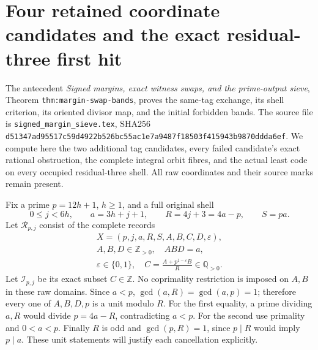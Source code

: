 \section{Four retained coordinate candidates and the exact residual-three first hit}
\label{sec:boundary-four-candidates}

The antecedent \emph{Signed margins, exact witness swaps, and the
prime-output sieve}, Theorem \texttt{thm:margin-swap-bands}, proves
the same-tag exchange, its shell criterion, its oriented divisor map,
and the initial forbidden bands. The source file is
\texttt{signed\_margin\_sieve.tex}, SHA256
\texttt{d51347ad95517c59d4922b526bc55ac1e7a9487f18503f415943b9870ddda6ef}.
We compute here the two additional tag candidates, every failed
candidate's exact rational obstruction, the complete integral orbit
fibres, and the actual least code on every occupied residual-three
shell. All raw coordinates and their source marks remain present.

Fix a prime \(p=12h+1\), \(h\ge1\), and a full original shell
\[
 0\le j<6h,\qquad a=3h+j+1,\qquad R=4j+3=4a-p,
 \qquad S=pa.
\]
Let \(\mathcal R_{p,j}\) consist of the complete records
\[
\begin{gathered}
 X=(p,j,a,R,S,A,B,C,D,\varepsilon),\\
 A,B,D\in\mathbb Z_{>0},\quad ABD=a,\\
 \varepsilon\in\{0,1\},\quad
 C=\frac{A+p^{1-\varepsilon}B}{R}\in\mathbb Q_{>0}.
\end{gathered}
\]
Let \(\mathcal I_{p,j}\) be its exact subset \(C\in\mathbb Z\).
No coprimality restriction is imposed on \(A,B\) in these raw
domains. Since \(a<p\), \(\gcd(a,R)=\gcd(a,p)=1\);
therefore every one of \(A,B,D,p\) is a unit modulo \(R\).
For the first equality, a prime dividing \(a,R\) would divide
\(p=4a-R\), contradicting \(a<p\). For the second use primality
and \(0<a<p\). Finally \(R\) is odd and
\(\gcd(p,R)=1\), since \(p\mid R\) would imply \(p\mid a\).
These unit statements will justify each cancellation explicitly.

